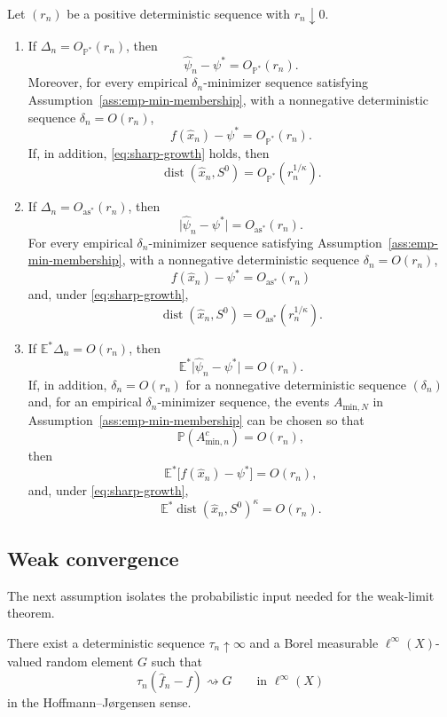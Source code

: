 \documentclass[11pt]{article}
\begin{document}
\begin{corollary}\label{cor:generic-mode}
Let $(r_{n})$ be a positive deterministic sequence with $r_{n}\downarrow0$. 
\begin{enumerate}[label=(\roman*),itemsep=0.25em]
\item If $\Delta_{n}=O_{\mathbb{P}^{*}}(r_{n})$, then 
\[
\hat{\psi}_{n}-\psi^{*}=O_{\mathbb{P}^{*}}(r_{n}).
\]
Moreover, for every empirical $\delta_{n}$-minimizer sequence satisfying
Assumption~\ref{ass:emp-min-membership}, with a nonnegative deterministic
sequence $\delta_{n}=O(r_{n})$, 
\[
f(\hat{x}_{n})-\psi^{*}=O_{\mathbb{P}^{*}}(r_{n}).
\]
If, in addition, \eqref{eq:sharp-growth} holds, then 
\[
\operatorname{dist}(\hat{x}_{n},S^{0})=O_{\mathbb{P}^{*}}(r_{n}^{1/\kappa}).
\]
\item If $\Delta_{n}=O_{\mathrm{as}^{*}}(r_{n})$, then
\[
\lvert\hat{\psi}_{n}-\psi^{*}\rvert=O_{\mathrm{as}^{*}}(r_{n}).
\]
For every empirical $\delta_{n}$-minimizer sequence satisfying
Assumption~\ref{ass:emp-min-membership}, with a nonnegative deterministic
sequence $\delta_{n}=O(r_{n})$,
\[
f(\hat{x}_{n})-\psi^{*}=O_{\mathrm{as}^{*}}(r_{n})
\]
and, under \eqref{eq:sharp-growth},
\[
\operatorname{dist}(\hat{x}_{n},S^{0})=O_{\mathrm{as}^{*}}(r_{n}^{1/\kappa}).
\]
\item If $\mathbb{E}^{*}\Delta_{n}=O(r_{n})$, then
\[
\mathbb{E}^{*}\lvert\hat{\psi}_{n}-\psi^{*}\rvert=O(r_{n}).
\]
If, in addition, $\delta_{n}=O(r_{n})$ for a nonnegative deterministic
sequence $(\delta_{n})$ and, for an empirical $\delta_{n}$-minimizer sequence,
the events $A_{\mathrm{min},N}$ in Assumption~\ref{ass:emp-min-membership}
can be chosen so that
\[
\mathbb{P}(A_{\mathrm{min},n}^{c})=O(r_{n}),
\]
then
\[
\mathbb{E}^{*}\bigl[f(\hat{x}_{n})-\psi^{*}\bigr]=O(r_{n}),
\]
and, under \eqref{eq:sharp-growth}, 
\[
\mathbb{E}^{*}\operatorname{dist}(\hat{x}_{n},S^{0})^{\kappa}=O(r_{n}).
\]
\end{enumerate}
\end{corollary}

\subsection{Weak convergence}

The next assumption isolates the probabilistic input needed for the
weak-limit theorem.

\begin{assumption}\label{ass:weak} There exist
a deterministic sequence $\tau_{n}\uparrow\infty$ and a Borel
measurable $\ell^{\infty}(X)$-valued random element $G$ such that
\begin{equation}
\tau_{n}(\hat{f}_{n}-f)\rightsquigarrow G\qquad\text{in }\ell^{\infty}(X)\label{eq:weak-empirical}
\end{equation}
in the Hoffmann--Jørgensen sense. \end{assumption}
\end{document}
